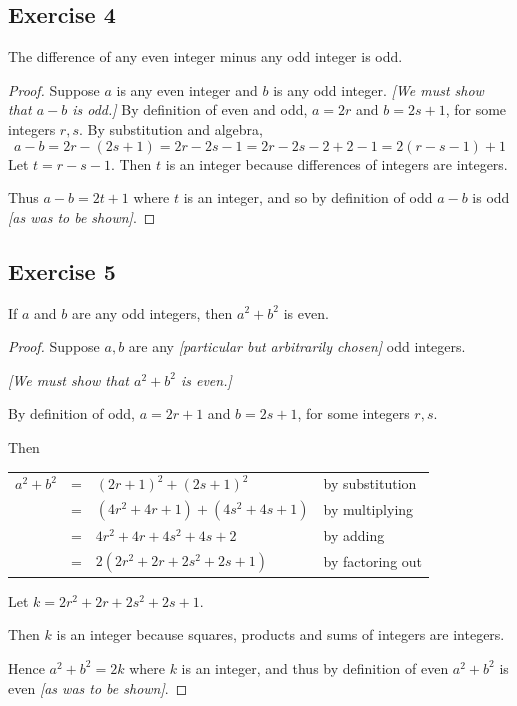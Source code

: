 \documentclass[14pt]{extarticle}
\newcommand{\cy}{\color{cyan}}
\begin{document}
\subsection{Exercise 4}
The difference of any even integer minus any odd integer is odd.

\begin{proof}
Suppose $a$ is any even integer and $b$ is any odd integer. 
{\it [We must show that $a - b$ is odd.]} By definition of even and odd, $a = 2r$ and $b = 2s + 1$, for some integers $r, s$. By substitution and algebra,
\[
a-b = 2r - (2s+1) = 2r-2s-1 = 2r-2s-2+2-1 = 2(r-s-1)+1
\]
Let $t = r-s-1$. Then $t$ is an integer because differences of integers are integers. 

Thus $a-b = 2t+1$ where $t$ is an integer, and so by definition of odd $a-b$ is odd {\it [as was to be shown]}.
\end{proof}

\subsection{Exercise 5}
If $a$ and $b$ are any odd integers, then $a^2 + b^2$ is even.

\begin{proof}
Suppose $a,b$ are any {\it [particular but arbitrarily chosen]} odd integers. 

{\it [We must show that $a^2+b^2$ is even.]}

By definition of odd, $a = 2r+1$ and $b = 2s+1$, for some integers $r,s$. 

Then

\begin{center}
\begin{tabular}{rcll}
$a^2+b^2$ & = & $(2r+1)^2 + (2s+1)^2$ & \cy by substitution \\
& = & $(4r^2 + 4r + 1) + (4s^2 + 4s + 1)$ & \cy by multiplying \\
& = & $4r^2 + 4r + 4s^2 + 4s + 2$ & \cy by adding \\
& = & $2(2r^2+2r+2s^2+2s+1)$ & \cy by factoring out \\
\end{tabular}
\end{center}

Let $k = 2r^2+2r+2s^2+2s+1$. 

Then $k$ is an integer because squares, products and sums of integers are integers. 

Hence $a^2+b^2 = 2k$ where $k$ is an integer, and thus by definition of even $a^2+b^2$ is even {\it [as was to be shown]}.
\end{proof}
\end{document}
